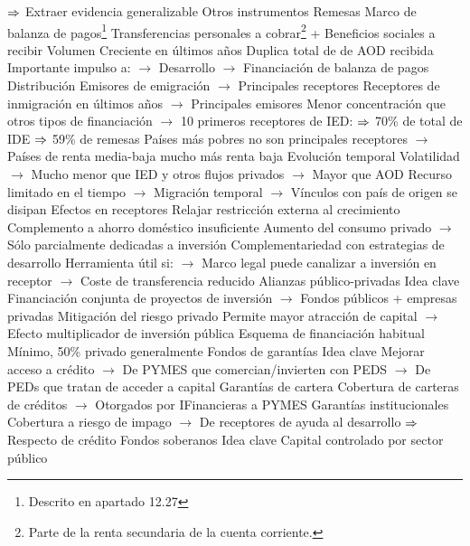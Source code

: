 \documentclass{nuevotema}
\begin{document}
\begin{esquemal}
				\4[] $\Rightarrow$ Extraer evidencia generalizable
		\2 Otros instrumentos
			\3 Remesas
				\4 Marco de balanza de pagos\footnote{Descrito en apartado 12.27}
				\4[] Transferencias personales a cobrar\footnote{Parte de la renta secundaria de la cuenta corriente.}
				\4[] + Beneficios sociales a recibir
				\4 Volumen
				\4[] Creciente en últimos años
				\4[] Duplica total de de AOD recibida
				\4[] Importante impulso a:
				\4[] $\to$ Desarrollo
				\4[] $\to$ Financiación de balanza de pagos
				\4 Distribución
				\4[] Emisores de emigración
				\4[] $\to$ Principales receptores
				\4[] Receptores de inmigración en últimos años
				\4[] $\to$ Principales emisores
				\4[] Menor concentración que otros tipos de financiación
				\4[] $\to$ 10 primeros receptores de IED:
				\4[] $\Rightarrow$ 70\% de total de IDE
				\4[] $\Rightarrow$ 59\% de remesas
				\4[] Países más pobres no son principales receptores
				\4[] $\to$ Países de renta media-baja mucho más renta baja
				\4 Evolución temporal
				\4[] Volatilidad
				\4[] $\to$ Mucho menor que IED y otros flujos privados
				\4[] $\to$ Mayor que AOD
				\4[] Recurso limitado en el tiempo
				\4[] $\to$ Migración temporal
				\4[] $\to$ Vínculos con país de origen se disipan
				\4 Efectos en receptores
				\4[] Relajar restricción externa al crecimiento
				\4[] Complemento a ahorro doméstico insuficiente
				\4[] Aumento del consumo privado
				\4[] $\to$ Sólo parcialmente dedicadas a inversión
				\4 Complementariedad con estrategias de desarrollo
				\4[] Herramienta útil si:
				\4[] $\to$ Marco legal puede canalizar a inversión en receptor
				\4[] $\to$ Coste de transferencia reducido
			\3 Alianzas público-privadas
				\4 Idea clave
				\4[] Financiación conjunta de proyectos de inversión
				\4[] $\to$ Fondos públicos + empresas privadas
				\4 Mitigación del riesgo privado
				\4[] Permite mayor atracción de capital
				\4[] $\to$ Efecto multiplicador de inversión pública
				\4 Esquema de financiación habitual
				\4[] Mínimo, 50\% privado generalmente
			\3 Fondos de garantías
				\4 Idea clave
				\4[] Mejorar acceso a crédito
				\4[] $\to$ De PYMES que comercian/invierten con PEDS
				\4[] $\to$ De PEDs que tratan de acceder a capital
				\4 Garantías de cartera
				\4[] Cobertura de carteras de créditos
				\4[] $\to$ Otorgados por IFinancieras a PYMES
				\4 Garantías institucionales
				\4[] Cobertura a riesgo de impago
				\4[] $\to$ De receptores de ayuda al desarrollo
				\4[] $\Rightarrow$ Respecto de crédito
			\3 Fondos soberanos
				\4 Idea clave
				\4[] Capital controlado por sector público

\end{esquemal}
\end{document}
